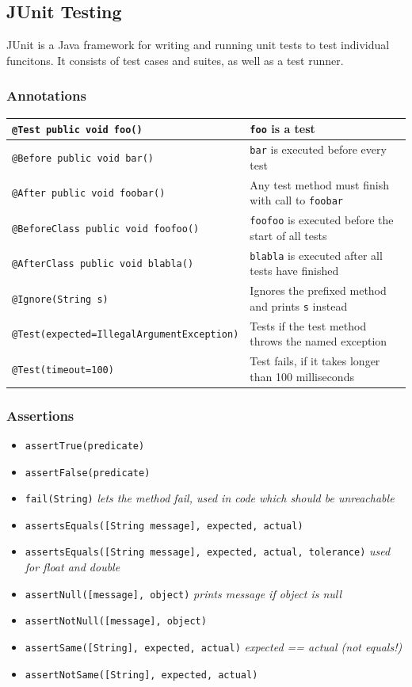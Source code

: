 \subsection{JUnit Testing}
JUnit is a Java framework for writing and running unit tests to test individual funcitons.
It consists of test cases and suites, as well as a test runner.


\subsubsection*{Annotations}
\renewcommand{\arraystretch}{1.4}
\begin{tabular}{ll}
	\texttt{@Test public void foo()} & \texttt{foo} is a test \\ \hline
	\texttt{@Before public void bar()} & \texttt{bar} is executed before every test \\ \hline
	\texttt{@After public void foobar()} & Any test method must finish with call to \texttt{foobar} \\ \hline
	\texttt{@BeforeClass public void foofoo()} & \texttt{foofoo} is executed before the start of all tests \\ \hline
	\texttt{@AfterClass public void blabla()} & \texttt{blabla} is executed after all tests have finished \\ \hline
	\texttt{@Ignore(String s)} & Ignores the prefixed method and prints \texttt{s} instead \\ \hline
	\texttt{@Test(expected=IllegalArgumentException)} & Tests if the test method throws the named exception \\ \hline
	\texttt{@Test(timeout=100)} & Test fails, if it takes longer than 100 milliseconds
\end{tabular}
\renewcommand{\arraystretch}{1}

\subsubsection*{Assertions}
\begin{itemize}[]
  \item \texttt{assertTrue(predicate)}
  \item \texttt{assertFalse(predicate)}
  \item \texttt{fail(String)} \textit{lets the method fail, used in code which should be unreachable}
  \item \texttt{assertsEquals([String message], expected, actual)}
  \item \texttt{assertsEquals([String message], expected, actual, tolerance)} \textit{used for float and double}
  \item \texttt{assertNull([message], object)} \textit{prints message if object is null}
  \item \texttt{assertNotNull([message], object)}
  \item \texttt{assertSame([String], expected, actual)} \textit{expected == actual (not equals!)}
  \item \texttt{assertNotSame([String], expected, actual)}
\end{itemize}
\newpage

